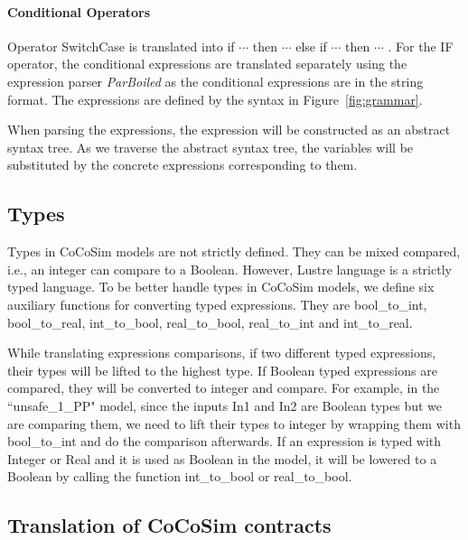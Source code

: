 \documentclass{article}
\begin{document}
\paragraph{Conditional Operators}
Operator SwitchCase is translated into \textsf{if $\cdots$ then $\cdots$ else if $\cdots$ then $\cdots$ }. 
For the IF operator, the conditional expressions are translated separately using the
expression parser \emph{ParBoiled} as the conditional expressions are in the string format. 
The expressions are defined by the syntax in Figure~\ref{fig:grammar}.

When parsing the expressions, the expression will be constructed as an abstract syntax tree. 
As we traverse the abstract syntax tree, the variables will be substituted by the concrete expressions corresponding to them.

\subsection{Types}

Types in CoCoSim models are not strictly defined. 
They can be mixed compared, i.e., an integer can compare to a Boolean.
However, Lustre language is a strictly typed language.
To be better handle types in CoCoSim models, we define six auxiliary functions
for converting typed expressions.
They are \textsf{bool\_to\_int, bool\_to\_real, int\_to\_bool, 
real\_to\_bool, real\_to\_int} and \textsf{int\_to\_real}. 

While translating expressions comparisons, if two different typed expressions, their types will be lifted to the highest type.
If Boolean typed expressions are compared, they will be converted to integer and compare.
For example, in the ``unsafe\_1\_PP" model, since the inputs In1 and In2 are Boolean types but we are comparing them, we need to lift their types to integer by wrapping them with \textsf{bool\_to\_int} and do the comparison afterwards. 
If an expression is typed with Integer or Real and it is used as Boolean in the model,  it will be lowered 
to a Boolean by calling the function \textsf{int\_to\_bool} or \textsf{real\_to\_bool}.
 

\subsection{Translation of CoCoSim contracts}
\end{document}

